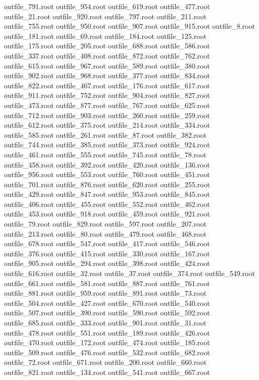 outfile_791.root
outfile_954.root
outfile_619.root
outfile_477.root
outfile_21.root
outfile_920.root
outfile_797.root
outfile_211.root
outfile_755.root
outfile_950.root
outfile_907.root
outfile_915.root
outfile_8.root
outfile_181.root
outfile_69.root
outfile_184.root
outfile_125.root
outfile_175.root
outfile_205.root
outfile_688.root
outfile_586.root
outfile_337.root
outfile_408.root
outfile_872.root
outfile_762.root
outfile_615.root
outfile_967.root
outfile_589.root
outfile_380.root
outfile_902.root
outfile_968.root
outfile_377.root
outfile_834.root
outfile_822.root
outfile_467.root
outfile_176.root
outfile_617.root
outfile_911.root
outfile_752.root
outfile_904.root
outfile_827.root
outfile_473.root
outfile_877.root
outfile_767.root
outfile_625.root
outfile_712.root
outfile_903.root
outfile_260.root
outfile_259.root
outfile_612.root
outfile_375.root
outfile_214.root
outfile_334.root
outfile_585.root
outfile_261.root
outfile_87.root
outfile_382.root
outfile_744.root
outfile_385.root
outfile_373.root
outfile_924.root
outfile_461.root
outfile_555.root
outfile_745.root
outfile_78.root
outfile_458.root
outfile_392.root
outfile_420.root
outfile_136.root
outfile_956.root
outfile_553.root
outfile_760.root
outfile_451.root
outfile_701.root
outfile_876.root
outfile_620.root
outfile_255.root
outfile_429.root
outfile_847.root
outfile_953.root
outfile_845.root
outfile_406.root
outfile_455.root
outfile_552.root
outfile_462.root
outfile_453.root
outfile_918.root
outfile_459.root
outfile_921.root
outfile_79.root
outfile_829.root
outfile_597.root
outfile_207.root
outfile_213.root
outfile_80.root
outfile_479.root
outfile_468.root
outfile_678.root
outfile_547.root
outfile_417.root
outfile_546.root
outfile_376.root
outfile_415.root
outfile_330.root
outfile_167.root
outfile_905.root
outfile_294.root
outfile_398.root
outfile_424.root
outfile_616.root
outfile_32.root
outfile_37.root
outfile_374.root
outfile_549.root
outfile_661.root
outfile_581.root
outfile_887.root
outfile_761.root
outfile_881.root
outfile_959.root
outfile_891.root
outfile_73.root
outfile_504.root
outfile_427.root
outfile_670.root
outfile_540.root
outfile_507.root
outfile_390.root
outfile_590.root
outfile_592.root
outfile_685.root
outfile_333.root
outfile_901.root
outfile_31.root
outfile_478.root
outfile_551.root
outfile_189.root
outfile_426.root
outfile_470.root
outfile_172.root
outfile_474.root
outfile_185.root
outfile_509.root
outfile_476.root
outfile_532.root
outfile_682.root
outfile_72.root
outfile_671.root
outfile_200.root
outfile_660.root
outfile_821.root
outfile_134.root
outfile_541.root
outfile_667.root

